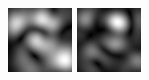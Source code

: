 \begin{figure}[ht]
\begin{center}
 \includegraphics[width=\columnwidth/9]{ch4/figures/mag_2_1.jpg}
 \includegraphics[width=\columnwidth/9]{ch4/figures/mag_2_2.jpg}

\end{center}
\end{figure}
